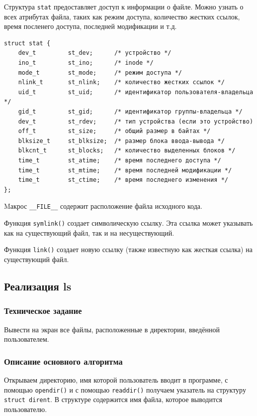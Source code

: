 \documentclass[a4paper,14pt]{extarticle}
\begin{document}
Структура \verb|stat| предоставляет доступ к информации о файле. Можно узнать о всех атрибутах файла, таких как режим доступа, количество жестких ссылок, время посленего доступа, последней модификации и т.д.

\begin{verbatim}
struct stat {
    dev_t         st_dev;      /* устройство */
    ino_t         st_ino;      /* inode */
    mode_t        st_mode;     /* режим доступа */
    nlink_t       st_nlink;    /* количество жестких ссылок */
    uid_t         st_uid;      /* идентификатор пользователя-владельца */
    gid_t         st_gid;      /* идентификатор группы-владельца */
    dev_t         st_rdev;     /* тип устройства (если это устройство) 
    off_t         st_size;     /* общий размер в байтах */
    blksize_t     st_blksize;  /* размер блока ввода-вывода */
    blkcnt_t      st_blocks;   /* количество выделенных блоков */
    time_t        st_atime;    /* время последнего доступа */
    time_t        st_mtime;    /* время последней модификации */
    time_t        st_ctime;    /* время последнего изменения */
};
\end{verbatim}

Mакрос \verb|__FILE__| содержит расположение файла исходного кода.

Функция \verb|symlink()| создает символическую ссылку.
Эта ссылка может указывать как на существующий файл, так и на несуществующий.

Функция \verb|link()| создает новую ссылку (также известную как жесткая ссылка) на существующий файл.

\subsection{Реализация ls}
\subsubsection{Техническое задание}
Вывести на экран все файлы, расположенные в директории, введённой пользователем.

\subsubsection{Описание основного алгоритма}
Открываем директорию, имя которой пользователь вводит в программе, с помощью \verb|opendir()| и с помощью \verb|readdir()| получаем указатель на структуру \verb|struct dirent|. В структуре содержится имя файла, которое выводится пользователю.
\end{document}
